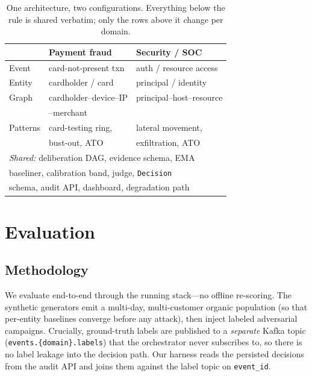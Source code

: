 \documentclass[sigconf,nonacm,screen]{acmart}
\newcommand{\dt}{.\allowbreak}    %
\begin{document}
\begin{table}[t]
\centering
\caption{One architecture, two configurations. Everything below the rule is
shared verbatim; only the rows above it change per domain.}
\label{tab:domains}
\begin{tabular}{lll}
\toprule
 & \textbf{Payment fraud} & \textbf{Security / SOC} \\
\midrule
Event   & card-not-present txn   & auth / resource access \\
Entity  & cardholder / card      & principal / identity \\
Graph   & cardholder--device--IP & principal--host--resource \\
        & --merchant             & \\
Patterns& card-testing ring,     & lateral movement, \\
        & bust-out, ATO          & exfiltration, ATO \\
\midrule
\multicolumn{3}{l}{\emph{Shared:} deliberation DAG, evidence schema, EMA} \\
\multicolumn{3}{l}{baseliner, calibration band, judge, \texttt{Decision}} \\
\multicolumn{3}{l}{schema, audit API, dashboard, degradation path} \\
\bottomrule
\end{tabular}
\end{table}

\section{Evaluation}
\label{sec:eval}

\subsection{Methodology}

We evaluate end-to-end through the running stack---no offline re-scoring. The
synthetic generators emit a multi-day, multi-customer organic population (so that
per-entity baselines converge before any attack), then inject labeled adversarial
campaigns. Crucially, ground-truth labels are published to a \emph{separate} Kafka
topic (\texttt{events\dt\{domain\}\dt labels}) that the orchestrator never subscribes
to, so there is no label leakage into the decision path. Our harness reads the
persisted decisions from the audit API and joins them against the label topic on
\texttt{event\_id}.
\end{document}
